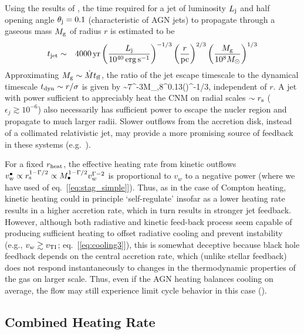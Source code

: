 \documentclass[usenatbib,fleqn]{mn2e}
\begin{document}
Using the results of \citet{Bromberg+11}, the time required for a jet of luminosity $L_{\rm
  j}$ and half opening angle $\theta_{\rm j} = 0.1$ (characteristic of
AGN jets) to propagate through a gaseous mass $M_{\rm g}$ of radius $r$ is estimated to be
\begin{eqnarray}
t_{\rm jet} &\sim& 4000\,{\rm yr}\left(\frac{{L}_{\rm j}}{10^{40}\,\rm erg\,s^{-1}}\right)^{-1/3}\left(\frac{r}{\rm pc}\right)^{2/3}\left(\frac{M_{\rm g}}{10^{8}M_{\odot}}\right)^{1/3} 
\end{eqnarray}
Approximating $M_{\rm g} \sim \dot{M}t_{\rm ff}$, the ratio of the jet escape timescale to the dynamical timescale $t_{\rm dyn} \sim r/\sigma$ is given by
\be
{} \sim 7^{-3}M_{\bullet,8}^{0.13}\left(\right)^{-1/3},
\ee
independent of $r$.  A jet with power sufficient to appreciably heat the CNM on radial scales $\sim r_{\rm s}$ ($\epsilon_{j} \gtrsim 10^{-6}$) also necessarily has sufficient power to escape the nucler region and propagate to much larger radii.  Slower outflows from the accretion disk, instead of a collimated relativistic jet, may provide a more promising source of feedback in these systems (e.g.~\citealt{Li+13}).    

For a fixed $r_{\rm heat}$, the effective heating rate from kinetic outflows $v_{\rm w}^{\bullet} \propto r_{\rm s}^{1-\Gamma/2} \propto M_{\bullet}^{1-\Gamma/2}v_{w}^{\Gamma-2}$ is proportional to $v_{w}$
to a negative power (where we have used of eq.~[\ref{eq:stag_simple}]).  Thus, as in the case of Compton heating, kinetic heating could in principle  `self-regulate' insofar as a lower heating rate results in a higher accretion rate, which in turn results in stronger jet feedback.  
However, although both radiative and kinetic feed-back process seem capable of producing sufficient heating to offset radiative cooling and prevent instability (e.g., $v_w \gtrsim v_{\rm TI}$; eq.~[\ref{eq:cooling3}]), this is somewhat deceptive because black hole feedback depends on the central accretion rate, which (unlike stellar feedback) does not respond instantaneously to changes in the thermodynamic properties of the gas on larger scale.  Thus, even if the AGN heating balances cooling on average, the flow may still experience limit cycle behavior in this case (\citealt{Yuan&Li11}).   


\subsection{Combined Heating Rate} 
\label{sec:combined}
\end{document}
